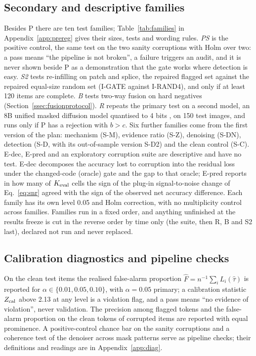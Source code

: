 \subsection{Secondary and descriptive families}\label{ssec:families}
Besides P there are ten test families; Table~\ref{tab:families} in Appendix~\ref{app:prereg} gives their sizes, tests and wording rules.
\emph{PS} is the positive control, the same test on the two sanity corruptions with Holm over two: a pass means ``the pipeline is not
broken'', a failure triggers an audit, and it is never shown beside P as a demonstration that the gate works where detection is easy.
\emph{S2} tests re-infilling on patch and splice, the repaired flagged set against the repaired equal-size random set (I-GATE against
I-RAND4), and only if at least 120 items are complete.
\emph{B} tests two-way fusion on hard negatives (Section~\ref{ssec:fusionprotocol}).
\emph{R} repeats the primary test on a second model, an 8B unified masked diffusion model quantised to 4 bits
, on 150 test images, and runs only if P has a rejection with $b>c$.
Six further families come from the first version of the plan: mechanism (S-M), evidence ratio (S-Z), denoising (S-DN), detection
(S-D, with its out-of-sample version S-D2) and the clean control (S-C).
E-dec, E-pred and an exploratory corruption suite are descriptive and have no test.
E-dec decomposes the accuracy lost to corruption into the residual loss under the changed-code (oracle) gate and the gap to that
oracle; E-pred reports in how many of $K_{\rm eval}$ cells the sign of the plug-in signal-to-noise change of Eq.~\eqref{eq:snr}
agreed with the sign of the observed net accuracy difference.
Each family has its own level 0.05 and Holm correction, with no multiplicity control across families.
Families run in a fixed order, and anything unfinished at the results freeze is cut in the reverse order by time only (the suite,
then R, B and S2 last), declared not run and never replaced.

\subsection{Calibration diagnostics and pipeline checks}\label{ssec:diagnostics}
On the clean test items the realised false-alarm proportion $\hat F=n^{-1}\sum_i L_i(\hat\tau)$ is reported for
$\alpha\in\{0.01,0.05,0.10\}$, with $\alpha=0.05$ primary; a calibration statistic $Z_{\rm cal}$ above 2.13 at any level is a
violation flag, and a pass means ``no evidence of violation'', never validation.
The precision among flagged tokens and the false-alarm proportion on the clean tokens of corrupted items are reported with equal
prominence.
A positive-control chance bar on the sanity corruptions and a coherence test of the denoiser across mask patterns serve as pipeline
checks; their definitions and readings are in Appendix~\ref{app:diag}.

